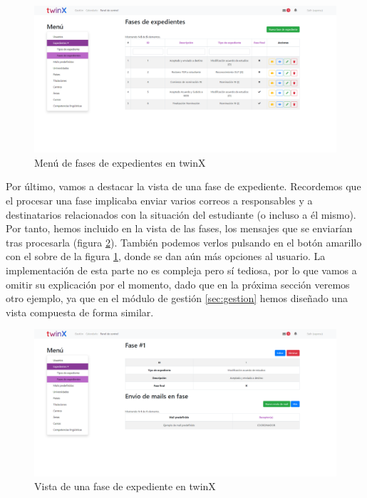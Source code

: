 \begin{figure}
	\centering
	\includegraphics[width=\textwidth]{Capturas de twinX/fases_expedientes_index}
	\caption{Menú de fases de expedientes en twinX}
	\label{fig:fasesexpedientesindex}
\end{figure}

Por último, vamos a destacar la vista de una fase de expediente. Recordemos que el procesar una fase implicaba enviar varios correos a responsables y a destinatarios relacionados con la situación del estudiante (o incluso a él mismo). Por tanto, hemos incluido en la vista de las fases, los mensajes que se enviarían tras procesarla (figura \ref{fig:fasesexpedientesvista}). También podemos verlos pulsando en el botón amarillo con el sobre de la figura \ref{fig:fasesexpedientesindex}, donde se dan aún más opciones al usuario. La implementación de esta parte no es compleja pero sí tediosa, por lo que vamos a omitir su explicación por el momento, dado que en la próxima sección veremos otro ejemplo, ya que en el módulo de gestión \ref{sec:gestion} hemos diseñado una vista compuesta de forma similar.

\begin{figure}
	\centering
	\includegraphics[width=\textwidth]{Capturas de twinX/fases_expedientes_vista}
	\caption{Vista de una fase de expediente en twinX}
	\label{fig:fasesexpedientesvista}
\end{figure}



